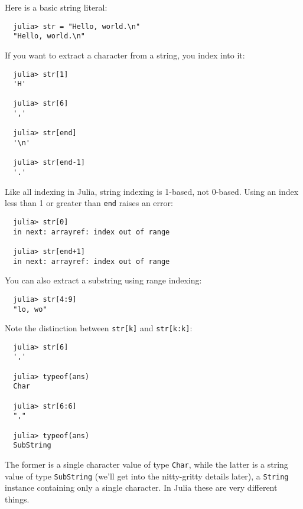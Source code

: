 \documentclass{article}
\begin{document}
Here is a basic string literal:
\begin{verbatim}
  julia> str = "Hello, world.\n"
  "Hello, world.\n"
\end{verbatim}
If you want to extract a character from a string, you index into it:
\begin{verbatim}
  julia> str[1]
  'H'

  julia> str[6]
  ','

  julia> str[end]
  '\n'

  julia> str[end-1]
  '.'
\end{verbatim}
Like all indexing in Julia, string indexing is 1-based, not 0-based.
Using an index less than 1 or greater than \verb|end| raises an error:
\begin{verbatim}
  julia> str[0]
  in next: arrayref: index out of range

  julia> str[end+1]
  in next: arrayref: index out of range
\end{verbatim}
You can also extract a substring using range indexing:
\begin{verbatim}
  julia> str[4:9]
  "lo, wo"
\end{verbatim}
Note the distinction between \verb|str[k]| and \verb|str[k:k]|:
\begin{verbatim}
  julia> str[6]
  ','

  julia> typeof(ans)
  Char

  julia> str[6:6]
  ","

  julia> typeof(ans)
  SubString
\end{verbatim}
The former is a single character value of type \verb|Char|, while the latter is a string value of type \verb|SubString| (we'll get into the nitty-gritty details later), a \verb|String| instance containing only a single character.
In Julia these are very different things.
\end{document}
